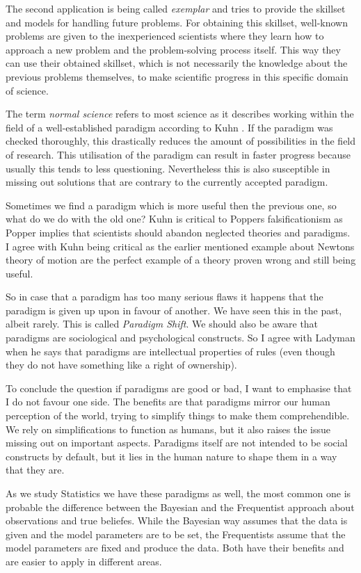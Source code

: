 \documentclass[11pt]{scrartcl}
\begin{document}
The second application is being called \textit{exemplar} and tries to provide the skillset and models for handling future problems. For obtaining this skillset, well-known problems are given to the inexperienced scientists where they learn how to approach a new problem and the problem-solving process itself. This way they can use their obtained skillset, which is not necessarily the knowledge about the previous problems themselves, to make scientific progress in this specific domain of science.

The term \textit{normal science} refers to most science as it describes working within the field of a well-established paradigm according to Kuhn \cite[p. 100]{ladyman}. If the paradigm was checked thoroughly, this drastically reduces the amount of possibilities in the field of research. This utilisation of the paradigm can result in faster progress because usually this tends to less questioning. Nevertheless this is also susceptible in missing out solutions that are contrary to the currently accepted paradigm.

Sometimes we find a paradigm which is more useful then the previous one, so what do we do with the old one? Kuhn is critical to Poppers falsificationism \cite[p. 101]{ladyman} as Popper implies that scientists should abandon neglected theories and paradigms. I agree with Kuhn being critical as the earlier mentioned example about Newtons theory of motion are the perfect example of a theory proven wrong and still being useful.

So in case that a paradigm has too many serious flaws it happens that the paradigm is given up upon in favour of another. We have seen this in the past, albeit rarely. This is called \textit{Paradigm Shift}. We should also be aware that paradigms are sociological and psychological constructs. So I agree with Ladyman when he says that paradigms are intellectual properties of rules (even though they do not have something like a right of ownership).

To conclude the question if paradigms are good or bad, I want to emphasise that I do not favour one side. The benefits are that paradigms mirror our human perception of the world, trying to simplify things to make them comprehendible. We rely on simplifications to function as humans, but it also raises the issue missing out on important aspects. Paradigms itself are not intended to be social constructs by default, but it lies in the human nature to shape them in a way that they are.

As we study Statistics we have these paradigms as well, the most common one is probable the difference between the Bayesian and the Frequentist approach about observations and true beliefes. While the Bayesian way assumes that the data is given and the model parameters are to be set, the Frequentists assume that the model parameters are fixed and produce the data. Both have their benefits and are easier to apply in different areas.
\end{document}
